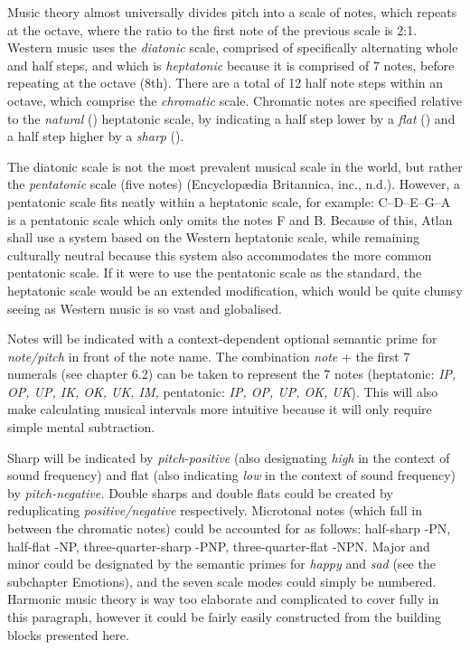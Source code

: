 \noindent Music theory almost universally divides pitch into a scale of notes, which repeats at the octave, where the ratio to the first note of the previous scale is 2:1. Western music uses the \textit{diatonic} scale, comprised of specifically alternating whole and half steps, and which is \textit{heptatonic} because it is comprised of 7 notes, before repeating at the octave (8th). There are a total of 12 half note steps within an octave, which comprise the \textit{chromatic} scale. Chromatic notes are specified relative to the \textit{natural} (\natural) heptatonic scale, by indicating a half step lower by a \textit{flat} (\flat) and a half step higher by a \textit{sharp}  (\sharp). 



The diatonic scale is not the most prevalent musical scale in the world,  but rather the \textit{pentatonic} scale (five notes) (Encyclop\ae dia Britannica, inc., n.d.). However, a pentatonic scale fits neatly within a heptatonic scale, for example: C–D–E–G–A is a pentatonic scale which only omits the notes F and B. Because of this, Atlan shall use a system based on the Western heptatonic scale, while remaining culturally neutral because this system also accommodates the more common pentatonic scale. If it were to use the pentatonic scale as the standard, the heptatonic scale would be an extended modification, which would be quite clumsy seeing as Western music is so vast and globalised. 

Notes will be indicated with a context-dependent optional semantic prime for \textit{note/pitch} in front of the note name. The combination {\it note} + the first 7 numerals (see chapter 6.2) can be taken to represent the 7 notes (heptatonic: \textit{IP, OP, UP, IK, OK, UK, IM,} pentatonic: \textit{IP, OP, UP, OK, UK}). This will also make calculating musical intervals more intuitive because it will only require simple mental subtraction. 

Sharp will be indicated by \textit{pitch-positive} (also designating \textit{high} in the context of sound frequency) and flat (also indicating \textit{low} in the context of sound frequency) by \textit{pitch-negative.} Double sharps and double flats could be created by reduplicating \textit{positive/negative} respectively. Microtonal notes (which fall in between the chromatic notes) could be accounted for as follows: half-sharp -PN, half-flat -NP, three-quarter-sharp  -PNP, three-quarter-flat -NPN. Major and minor could be designated by the semantic primes for \textit{happy} and \textit{sad} (see the subchapter Emotions), and the seven scale modes could simply be numbered. Harmonic music theory is way too elaborate and complicated to cover fully in this paragraph, however it could be fairly easily constructed from the building blocks presented here. 

